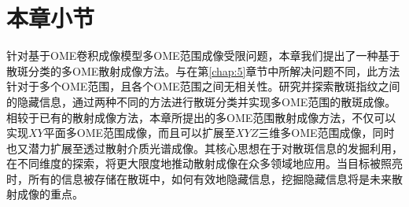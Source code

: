 \section{本章小节}
针对基于OME卷积成像模型多OME范围成像受限问题，本章我们提出了一种基于散斑分类的多OME散射成像方法。与在第\ref{chap:5}章节中所解决问题不同，此方法针对于多个OME范围，且各个OME范围之间无相关性。研究并探索散斑指纹之间的隐藏信息，通过两种不同的方法进行散斑分类并实现多OME范围的散斑成像。相较于已有的散射成像方法，本章所提出的多OME范围散射成像方法，不仅可以实现$XY$平面多OME范围成像，而且可以扩展至$XYZ$三维多OME范围成像，同时也又潜力扩展至透过散射介质光谱成像。其核心思想在于对散斑信息的发掘利用，在不同维度的探索，将更大限度地推动散射成像在众多领域地应用。当目标被照亮时，所有的信息被存储在散斑中，如何有效地隐藏信息，挖掘隐藏信息将是未来散射成像的重点。
